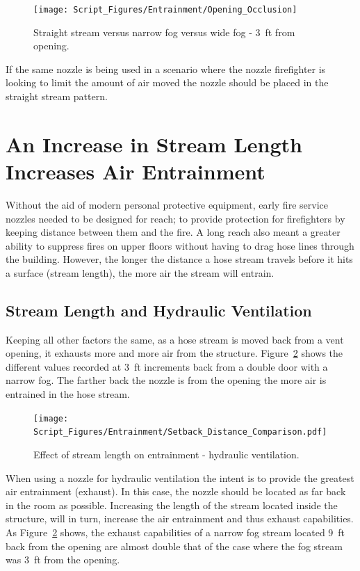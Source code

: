 \documentclass[12pt,oneside]{book}
\begin{document}
\begin{figure}[H]
\centering
\texttt{[image: Script\_Figures/Entrainment/Opening\_Occlusion]}
\caption[Straight Stream vs. Narrow Fog vs. Wide Fog - 3~ft from Opening]{Straight stream versus narrow fog versus wide fog - 3~ft from opening.}
\label{fig:StraightStream_Fog_Comp}
\end{figure}

If the same nozzle is being used in a scenario where the nozzle firefighter is looking to limit the amount of air moved the nozzle should be placed in the straight stream pattern. 

\section{An Increase in Stream Length Increases Air Entrainment}
Without the aid of modern personal protective equipment, early fire service nozzles needed to be designed for reach; to provide protection for firefighters by keeping distance between them and the fire. A long reach also meant a greater ability to suppress fires on upper floors without having to drag hose lines through the building. However, the longer the distance a hose stream travels before it hits a surface (stream length), the more air the stream will entrain.

\subsection{Stream Length and Hydraulic Ventilation}
Keeping all other factors the same, as a hose stream is moved back from a vent opening, it exhausts more and more air from the structure. Figure~\ref{fig:Setback} shows the different values recorded at 3~ft increments back from a double door with a narrow fog. The farther back the nozzle is from the opening the more air is entrained in the hose stream. 

\begin{figure}[H]
\centering
\texttt{[image: Script\_Figures/Entrainment/Setback\_Distance\_Comparison.pdf]}
\caption[Effect of Stream Length on Entrainment - Hydraulic Ventilation]{Effect of stream length on entrainment - hydraulic ventilation.}
\label{fig:Setback}
\end{figure}

When using a nozzle for hydraulic ventilation the intent is to provide the greatest air entrainment (exhaust). In this case, the nozzle should be located as far back in the room as possible. Increasing the length of the stream located inside the structure, will in turn, increase the air entrainment and thus exhaust capabilities. As Figure~\ref{fig:Setback} shows, the exhaust capabilities of a narrow fog stream located 9~ft back from the opening are almost double that of the case where the fog stream was 3~ft from the opening. 
\end{document}
